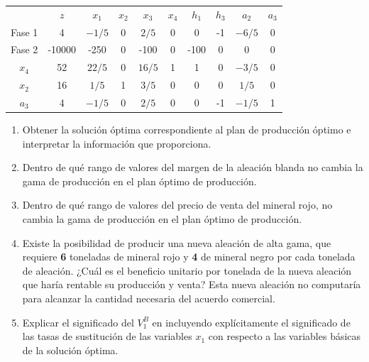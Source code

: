 \begin{center}
\begin{tabular}{c|c|cccccccc|}
 & $z$ & $x_1$ & $x_2$ & $x_3$ & $x_4$ & $h_1$ & $h_3$ & $a_2$ & $a_3$\\ 
Fase 1 & 4 & $-1/5$ & 0 & $2/5$ & 0 & 0 & -1 & $-6/5$ & 0 \\ 
Fase 2 & -10000 & -250 & 0 & -100 & 0 & -100 & 0 & 0 & 0 \\ 
\hline
$x_4$ & 52  & $22/5$ & 0 & $16/5$ & 1 & 1 & 0 & $-3/5$ & 0\\ 
$x_2$ & 16  & $1/5$ & 1 & $3/5$ & 0 & 0 & 0 & $1/5$ & 0\\ 
$a_3$ & 4  & $-1/5$ & 0 & $2/5$ & 0 & 0 & -1 & $-1/5$ & 1\\ 
\hline
\end{tabular}
\end{center}


\begin{enumerate}

\item Obtener la solución óptima correspondiente al plan de producción óptimo e interpretar la información que proporciona.

\item Dentro de qué rango de valores del margen de la aleación blanda no cambia la gama de producción en el plan óptimo de producción.

\item Dentro de qué rango de valores del precio de venta del mineral rojo, no cambia la gama de producción en el plan óptimo de producción.

\item Existe la posibilidad de producir una nueva aleación de alta gama, que requiere \textbf{6} toneladas de mineral rojo y \textbf{4} de mineral negro por cada tonelada de aleación. ¿Cuál es el beneficio unitario por tonelada de la nueva aleación que haría rentable su producción y venta? Esta nueva aleación no computaría para alcanzar la cantidad necesaria del acuerdo comercial.

\item Explicar el significado del $V^B_1$ en incluyendo explícitamente el significado de las tasas de sustitución de las variables $x_1$ con respecto a las variables básicas de la solución óptima.


\end{enumerate}





